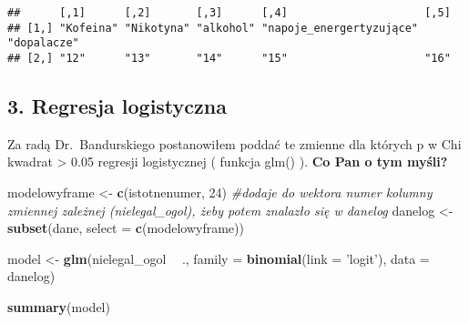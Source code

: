 \documentclass[]{article}
\newenvironment{Shaded}{\begin{snugshade}}{\end{snugshade}}
\newcommand{\KeywordTok}[1]{\textcolor[rgb]{0.13,0.29,0.53}{\textbf{#1}}}
\newcommand{\DataTypeTok}[1]{\textcolor[rgb]{0.13,0.29,0.53}{#1}}
\newcommand{\DecValTok}[1]{\textcolor[rgb]{0.00,0.00,0.81}{#1}}
\newcommand{\StringTok}[1]{\textcolor[rgb]{0.31,0.60,0.02}{#1}}
\newcommand{\CommentTok}[1]{\textcolor[rgb]{0.56,0.35,0.01}{\textit{#1}}}
\newcommand{\OperatorTok}[1]{\textcolor[rgb]{0.81,0.36,0.00}{\textbf{#1}}}
\newcommand{\NormalTok}[1]{#1}
\begin{document}
\begin{verbatim}
##      [,1]      [,2]       [,3]      [,4]                     [,5]       
## [1,] "Kofeina" "Nikotyna" "alkohol" "napoje_energertyzujące" "dopalacze"
## [2,] "12"      "13"       "14"      "15"                     "16"
\end{verbatim}

\subsection{3. Regresja logistyczna}\label{regresja-logistyczna}

Za radą Dr.~Bandurskiego postanowiłem poddać te zmienne dla których p w
Chi kwadrat \textgreater{} 0.05 regresji logistycznej ( funkcja glm() ).
\textbf{Co Pan o tym myśli?}

\begin{Shaded}
\begin{Highlighting}[]
\NormalTok{modelowyframe <-}\StringTok{ }\KeywordTok{c}\NormalTok{(istotnenumer, }\DecValTok{24}\NormalTok{) }\CommentTok{#dodaje do wektora numer kolumny zmiennej zależnej (nielegal_ogol), żeby potem znalazło się w danelog}
\NormalTok{danelog <-}\StringTok{ }\KeywordTok{subset}\NormalTok{(dane, }\DataTypeTok{select =} \KeywordTok{c}\NormalTok{(modelowyframe))}

\NormalTok{model <-}
\StringTok{  }\KeywordTok{glm}\NormalTok{(nielegal_ogol }\OperatorTok{~}\StringTok{ }\NormalTok{.,}
      \DataTypeTok{family =} \KeywordTok{binomial}\NormalTok{(}\DataTypeTok{link =} \StringTok{'logit'}\NormalTok{),}
      \DataTypeTok{data =}\NormalTok{ danelog)}

\KeywordTok{summary}\NormalTok{(model)}
\end{Highlighting}
\end{Shaded}
\end{document}
